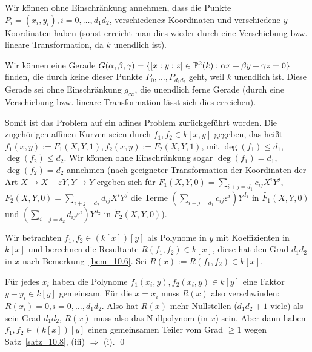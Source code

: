 \begin{bew}[Fortsetzung]
	Wir können ohne Einschränkung annehmen, dass die Punkte $P_i = (x_i,y_i), i=0,\dots,d_1d_2$, verschiedene\linebreak $x$-Koordinaten und verschiedene $y$-Koordinaten haben (sonst erreicht man dies wieder durch eine Verschiebung bzw. lineare Transformation, da $k$ unendlich ist).
\end{bew}

\begin{bew}[Fortsetzung]
	Wir können eine Gerade $G(\alpha,\beta,\gamma) = \{ [x:y:z] \in \mathbb{P}^2(k) : \alpha x + \beta y + \gamma z = 0\}$ finden, die durch keine dieser Punkte $P_0, \dots, P_{d_1d_2}$ geht, weil $k$ unendlich ist. 
	Diese Gerade sei ohne Einschränkung $g_\infty$, die unendlich ferne Gerade (durch eine Verschiebung bzw. lineare Transformation lässt sich dies erreichen).
\end{bew}

\begin{bew}[Fortsetzung]
	Somit ist das Problem auf ein affines Problem zurückgeführt worden. 
	Die zugehörigen affinen Kurven seien durch $f_1,f_2 \in k[x,y]$ gegeben, das heißt $f_1(x,y) := F_1(X,Y,1), f_2(x,y) := F_2(X,Y,1)$, mit $\deg(f_1) \leq d_1$,\linebreak $\deg(f_2) \leq d_2$. 
	Wir können ohne Einschränkung sogar $\deg(f_1) = d_1$, $\deg(f_2) = d_2$ annehmen (nach geeigneter Transformation der Koordinaten der Art $X \rightarrow X + \varepsilon Y, Y \rightarrow Y$ ergeben sich für $F_1(X,Y,0) = \sum_{i+j = d_1} c_{ij} X^i Y^j$,\linebreak $F_2(X,Y,0) = \sum_{i+j = d_2} d_{ij} X^i Y^j$ die Terme $(\sum_{i+j = d_1} c_{ij} \varepsilon^i) Y^{d_1}$ in $\widetilde{F_1}(X,Y,0)$ und $(\sum_{i+j=d_2} d_{ij} \varepsilon^i)Y^{d_2}$ in $\widetilde{F_2}(X,Y,0)$).
\end{bew}

\begin{bew}[Fortsetzung]
	Wir betrachten $f_1,f_2 \in (k[x])[y]$ als Polynome in $y$ mit Koeffizienten in $k[x]$ und berechnen die Resultante $R(f_1,f_2) \in k[x]$, diese hat den Grad $d_1 d_2$ in $x$ nach Bemerkung~\ref{bem_10.6}. 
	Sei $R(x) := R(f_1,f_2) \in k[x]$.
\end{bew}

\begin{bew}[Fortsetzung]
	Für jedes $x_i$ haben die Polynome $f_1(x_i,y), f_2(x_i,y) \in k[y]$ eine Faktor $y-y_i \in k[y]$ gemeinsam. 
	Für die $x = x_i$ muss $R(x)$ also verschwinden: $R(x_i) = 0, i=0, \dots, d_1d_2$. 
	Also hat $R(x)$ mehr Nullstellen ($d_1d_2+1$ viele) als sein Grad $d_1d_2$, $R(x)$ muss also das Nullpolynom (in $x$) sein. 
	Aber dann haben $f_1,f_2 \in (k[x])[y]$ einen gemeinsamen Teiler vom Grad $\geq 1$ wegen Satz~\ref{satz_10.8}, (iii) $\Rightarrow$ (i). \qed
\end{bew}

